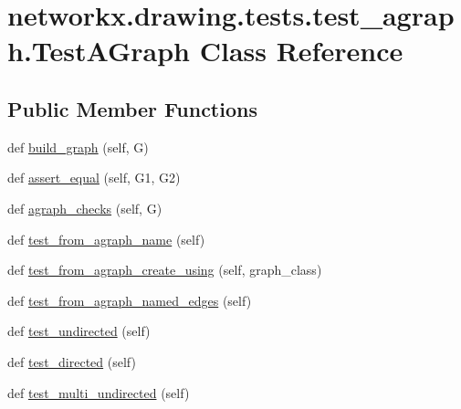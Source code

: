 \hypertarget{classnetworkx_1_1drawing_1_1tests_1_1test__agraph_1_1TestAGraph}{}\section{networkx.\+drawing.\+tests.\+test\+\_\+agraph.\+Test\+A\+Graph Class Reference}
\label{classnetworkx_1_1drawing_1_1tests_1_1test__agraph_1_1TestAGraph}
\subsection*{Public Member Functions}
\begin{DoxyCompactItemize}
\item 
def \hyperlink{classnetworkx_1_1drawing_1_1tests_1_1test__agraph_1_1TestAGraph_a871224d206fd70625f892afa3ae6bd4d}{build\+\_\+graph} (self, G)
\item 
def \hyperlink{classnetworkx_1_1drawing_1_1tests_1_1test__agraph_1_1TestAGraph_a7d7e0f3967c479576fa6f643c7a24248}{assert\+\_\+equal} (self, G1, G2)
\item 
def \hyperlink{classnetworkx_1_1drawing_1_1tests_1_1test__agraph_1_1TestAGraph_a50ae269cd1d5cac16f8a746ecd812bca}{agraph\+\_\+checks} (self, G)
\item 
def \hyperlink{classnetworkx_1_1drawing_1_1tests_1_1test__agraph_1_1TestAGraph_abe17c0580402ec7f223913f4c6cca162}{test\+\_\+from\+\_\+agraph\+\_\+name} (self)
\item 
def \hyperlink{classnetworkx_1_1drawing_1_1tests_1_1test__agraph_1_1TestAGraph_ab638883a7540228da28a12c7edd59cfb}{test\+\_\+from\+\_\+agraph\+\_\+create\+\_\+using} (self, graph\+\_\+class)
\item 
def \hyperlink{classnetworkx_1_1drawing_1_1tests_1_1test__agraph_1_1TestAGraph_af31c3e6e6434381ef9c0539465aa2a7c}{test\+\_\+from\+\_\+agraph\+\_\+named\+\_\+edges} (self)
\item 
def \hyperlink{classnetworkx_1_1drawing_1_1tests_1_1test__agraph_1_1TestAGraph_a5a2b58e3e7ffa9bb1f46437cd59d5343}{test\+\_\+undirected} (self)
\item 
def \hyperlink{classnetworkx_1_1drawing_1_1tests_1_1test__agraph_1_1TestAGraph_a61ac648a0d735336d1222010ac567a10}{test\+\_\+directed} (self)
\item 
def \hyperlink{classnetworkx_1_1drawing_1_1tests_1_1test__agraph_1_1TestAGraph_a4aaae95a7a38b0fbb7be9c00fae1e987}{test\+\_\+multi\+\_\+undirected} (self)

\end{DoxyCompactItemize}
